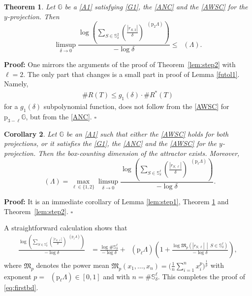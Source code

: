 \documentclass[a4paper, 11pt]{article}
\newenvironment{Proof}{\noindent \textbf{Proof:}}{\hfill$\square$\\}
\DeclareMathOperator{\dB}{\dim_{\mathrm{B}}}
\DeclareMathOperator{\dLB}{\underline{\dim}_{\mathrm{B}}}
\numberwithin{equation}{section}
\theoremstyle{plain}
\newtheorem{theorem}{Theorem}[section]
\newtheorem{corollary}[theorem]{Corollary}
\theoremstyle{remark}
\theoremstyle{definition}
\begin{document}
\begin{theorem} \label{lem:step2nbh}
Let $\mathbb{G}$ be a \ref{A1} satisfying \ref{G1}, the \ref{ANC} and the \ref{AWSC} for the $y$-projection. Then
\begin{equation*}
\limsup_{\delta\to0}\frac{\log\left(\sum_{S\in\mathbb{S}_{\delta}^{2}}\left(\frac{|r_{S,2}|}{\delta}\right)^{\dB(\mathrm{p}_2\Lambda)}\right)}{-\log\delta}\leq\dLB(\Lambda).
\end{equation*}
\end{theorem}

\begin{Proof}
One mirrors the arguments of the proof of Theorem~\ref{lem:step2} with $\ell = 2$. The only part that changes is a small part in proof of Lemma \ref{futol1}. Namely,
\begin{align*}
\#R(T) \leq g_1(\delta) \cdot \#R^*(T)
\end{align*} 
for a $g_1(\delta)$ subpolynomial function, does not follow from the \ref{AWSC} for $\mathrm{p}_{3-\ell}\mathbb{G}$, but from the \ref{ANC}.
\end{Proof}

\begin{corollary}\label{cor:dim1}
	Let $\mathbb{G}$ be an \ref{A1} such that either the \ref{AWSC} holds for both projections, or it satisfies the \ref{G1}, the \ref{ANC} and the \ref{AWSC} for the $y$-projection. Then the box-counting dimension of the attractor exists. Moreover,
	\begin{equation*}
		\dB(\Lambda)=\max_{\ell\in\{1,2\}}\limsup_{\delta\to0}\frac{\log\left(\sum_{S\in\mathbb{S}_{\delta}^{\ell}}\left(\frac{|r_{S,\ell}|}{\delta}\right)^{\dB(\mathrm{p}_\ell\Lambda)}\right)}{-\log\delta}.
	\end{equation*}
\end{corollary}

\begin{Proof}
	It is an immediate corollary of Lemma \ref{lem:step1}, Theorem \ref{lem:step2nbh} and Theorem~\ref{lem:step2}.
\end{Proof}

A straightforward calculation shows that
\begin{align*}
\frac{\log \left(\sum_{S \in \mathbb{S}_\delta^\ell} \left(\frac{|r_{S,\ell}|}{\delta}\right)^{\dB(\mathrm{p}_\ell\Lambda)}\right)}{-\log\delta}
&= \frac{\log \# \mathbb{S}_\delta^\ell}{-\log\delta}
+ \dB(\mathrm{p}_\ell\Lambda) \left( 1 + \frac{\log\mathfrak{M}_{p}\left( |r_{S,\ell}| \,\middle|\, S \in \mathbb{S}_\delta^\ell\right)}{-\log\delta} \right),
\end{align*}
where $\mathfrak{M}_p$ denotes the power mean $\mathfrak{M}_p(x_1, \dots , x_n) = \Big(\frac{1}{n} \sum_{i=1}^nx_i^p \Big)^{\frac{1}{p}}$ with exponent $p = \dB(\mathrm{p}_\ell\Lambda) \in [0,1]$ and with $n = \#\mathbb{S}_\delta^\ell$. This completes the proof of \eqref{eq:firstbd}.
\end{document}
